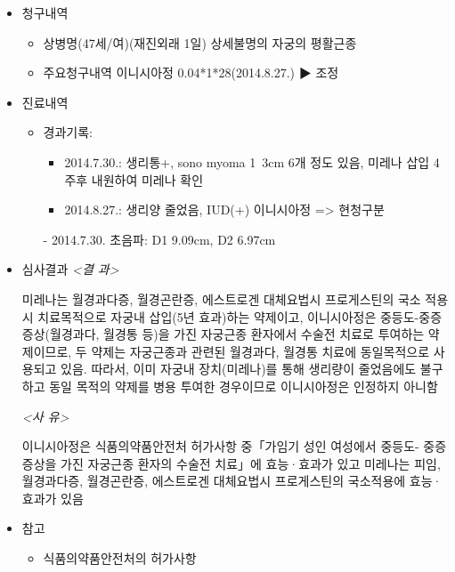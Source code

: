 \begin{itemize}[■]\tightlist
\item 청구내역
	\begin{itemize}[○]\tightlist
	\item 상병명(47세/여)(재진외래 1일)
    상세불명의 자궁의 평활근종 
	\item 주요청구내역
    이니시아정 0.04*1*28(2014.8.27.) ▶ 조정  
	\end{itemize}
\item 진료내역
	\begin{itemize}[○]\tightlist
	\item 경과기록:
		\begin{itemize}[-]\tightlist
		\item 2014.7.30.: 생리통+, sono myoma 1~3cm 6개 정도 있음, 미레나 삽입
                 4주후 내원하여 미레나 확인 
		\item 2014.8.27.: 생리양 줄었음, IUD(+)
                이니시아정 => 현청구분
		\end{itemize}		
  - 2014.7.30. 초음파: D1 9.09cm, D2 6.97cm 
	\end{itemize}
\item 심사결과
  \emph{<결  과> }\par
 미레나는 월경과다증, 월경곤란증, 에스트로겐 대체요법시 프로게스틴의 국소
 적용시 치료목적으로 자궁내 삽입(5년 효과)하는 약제이고, 
 이니시아정은 중등도-중증 증상(월경과다, 월경통 등)을 가진 자궁근종 환자에서
 수술전 치료로 투여하는 약제이므로, 두 약제는 자궁근종과 관련된 월경과다,
 월경통 치료에 동일목적으로 사용되고 있음.
 따라서, 이미 자궁내 장치(미레나)를 통해 생리량이 줄었음에도 불구하고 동일
 목적의 약제를 병용 투여한 경우이므로 이니시아정은 인정하지 아니함  \par

 \emph{<사  유>}\par
 이니시아정은 식품의약품안전처 허가사항 중「가임기 성인 여성에서 중등도-
 중증 증상을 가진 자궁근종 환자의 수술전 치료」에 효능·효과가 있고 
 미레나는 피임, 월경과다증, 월경곤란증, 에스트로겐 대체요법시 프로게스틴의 
 국소적용에 효능·효과가 있음 

\item 참고
	\begin{itemize}[○]\tightlist
	\item 식품의약품안전처의 허가사항
	\end{itemize}
\end{itemize}